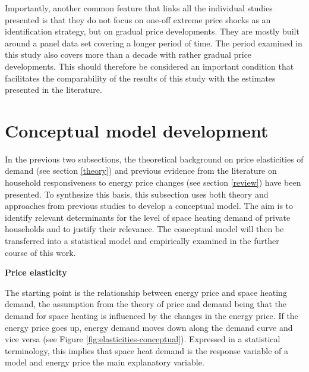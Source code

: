 \documentclass[12pt,twoside]{reedthesis}
\begin{document}
Importantly, another common feature that links all the individual studies presented is that they do not focus on one-off extreme price shocks as an identification strategy, but on gradual price developments. They are mostly built around a panel data set covering a longer period of time. The period examined in this study also covers more than a decade with rather gradual price developments. This should therefore be considered an important condition that facilitates the comparability of the results of this study with the estimates presented in the literature.

\hypertarget{conceptual-model}{%
\section{Conceptual model development}\label{conceptual-model}}

In the previous two subsections, the theoretical background on price elasticities of demand (see section \ref{theory}) and previous evidence from the literature on household responsiveness to energy price changes (see section \ref{review}) have been presented. To synthesize this basis, this subsection uses both theory and approaches from previous studies to develop a conceptual model. The aim is to identify relevant determinants for the level of space heating demand of private households and to justify their relevance. The conceptual model will then be transferred into a statistical model and empirically examined in the further course of this work.

\textbf{Price elasticity}

The starting point is the relationship between energy price and space heating demand, the assumption from the theory of price and demand being that the demand for space heating is influenced by the changes in the energy price. If the energy price goes up, energy demand moves down along the demand curve and vice versa (see Figure \ref{fig:elasticities-conceptual}). Expressed in a statistical terminology, this implies that space heat demand is the response variable of a model and energy price the main explanatory variable.
\end{document}

